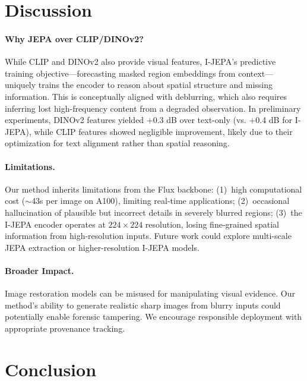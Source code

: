 \documentclass{article}
\begin{document}
\section{Discussion}
\label{sec:discussion}

\paragraph{Why JEPA over CLIP/DINOv2?}
While CLIP and DINOv2 also provide visual features, I-JEPA's predictive training objective---forecasting masked region embeddings from context---uniquely trains the encoder to reason about spatial structure and missing information. This is conceptually aligned with deblurring, which also requires inferring lost high-frequency content from a degraded observation. In preliminary experiments, DINOv2 features yielded +0.3 dB over text-only (vs. +0.4 dB for I-JEPA), while CLIP features showed negligible improvement, likely due to their optimization for text alignment rather than spatial reasoning.

\paragraph{Limitations.}
Our method inherits limitations from the Flux backbone: (1)~high computational cost ($\sim$43s per image on A100), limiting real-time applications; (2)~occasional hallucination of plausible but incorrect details in severely blurred regions; (3)~the I-JEPA encoder operates at $224 \times 224$ resolution, losing fine-grained spatial information from high-resolution inputs. Future work could explore multi-scale JEPA extraction or higher-resolution I-JEPA models.

\paragraph{Broader Impact.}
Image restoration models can be misused for manipulating visual evidence. Our method's ability to generate realistic sharp images from blurry inputs could potentially enable forensic tampering. We encourage responsible deployment with appropriate provenance tracking.

\section{Conclusion}
\label{sec:conclusion}
\end{document}

